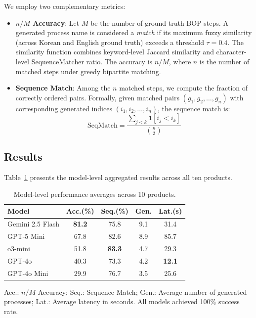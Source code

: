 We employ two complementary metrics:

\begin{itemize}
    \item \textbf{$n/M$ Accuracy}: Let $M$ be the number of ground-truth BOP steps. A generated process name is considered a \textit{match} if its maximum fuzzy similarity (across Korean and English ground truth) exceeds a threshold $\tau = 0.4$. The similarity function combines keyword-level Jaccard similarity and character-level SequenceMatcher ratio. The accuracy is $n/M$, where $n$ is the number of matched steps under greedy bipartite matching.

    \item \textbf{Sequence Match}: Among the $n$ matched steps, we compute the fraction of correctly ordered pairs. Formally, given matched pairs $(g_1, g_2, \ldots, g_n)$ with corresponding generated indices $(i_1, i_2, \ldots, i_n)$, the sequence match is:
    \begin{equation}
        \text{SeqMatch} = \frac{\sum_{j < k} \mathbf{1}[i_j < i_k]}{\binom{n}{2}}
    \end{equation}
\end{itemize}

\subsection{Results}

Table~\ref{tab:model_averages} presents the model-level aggregated results across all ten products.

\begin{table}[htbp]
\centering
\caption{Model-level performance averages across 10 products.}
\label{tab:model_averages}
\begin{tabular}{lcccc}
\hline
\textbf{Model} & \textbf{Acc.(\%)} & \textbf{Seq.(\%)} & \textbf{Gen.} & \textbf{Lat.(s)} \\
\hline
Gemini 2.5 Flash & \textbf{81.2} & 75.8 & 9.1 & 31.4 \\
GPT-5 Mini       & 67.8 & 82.6 & 8.9 & 85.7 \\
o3-mini           & 51.8 & \textbf{83.3} & 4.7 & 29.3 \\
GPT-4o            & 40.3 & 73.3 & 4.2 & \textbf{12.1} \\
GPT-4o Mini       & 29.9 & 76.7 & 3.5 & 25.6 \\
\hline
\end{tabular}
\begin{tablenotes}
\small
\item Acc.: $n/M$ Accuracy; Seq.: Sequence Match; Gen.: Average number of generated processes; Lat.: Average latency in seconds. All models achieved 100\% success rate.
\end{tablenotes}
\end{table}

